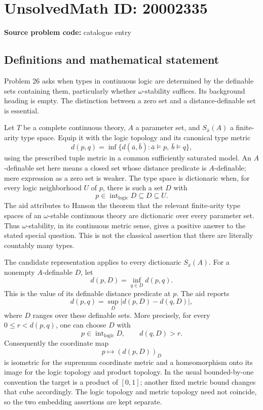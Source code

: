 \documentclass[11pt]{article}
\begin{document}
\section*{UnsolvedMath ID: 20002335}
\textbf{Source problem code:} catalogue entry
\subsection{Definitions and mathematical statement}
Problem 26 asks when types in continuous logic are determined by the definable sets containing them, particularly whether \(\omega\)-stability suffices. Its background heading is empty. The distinction between a zero set and a distance-definable set is essential.

Let \(T\) be a complete continuous theory, \(A\) a parameter set, and \(S_{\bar x}(A)\) a finite-arity type space. Equip it with the logic topology and its canonical type metric
\[
 d(p,q)=\inf\{d(\bar a,\bar b):\bar a\models p,\ \bar b\models q\},
\]
using the prescribed tuple metric in a common sufficiently saturated model. An \(A\)-definable set here means a closed set whose distance predicate is \(A\)-definable; mere expression as a zero set is weaker. The type space is dictionaric when, for every logic neighborhood \(U\) of \(p\), there is such a set \(D\) with
\[
 p\in\operatorname{int}_{\mathrm{logic}}D\subseteq D\subseteq U.
\]
The aid attributes to Hanson the theorem that the relevant finite-arity type spaces of an \(\omega\)-stable continuous theory are dictionaric over every parameter set. Thus \(\omega\)-stability, in its continuous metric sense, gives a positive answer to the stated special question. This is not the classical assertion that there are literally countably many types.

The candidate representation applies to every dictionaric \(S_{\bar x}(A)\). For a nonempty \(A\)-definable \(D\), let
\[
 d(p,D)=\inf_{q\in D}d(p,q).
\]
This is the value of its definable distance predicate at \(p\). The aid reports
\[
 d(p,q)=\sup_D|d(p,D)-d(q,D)|,
\]
where \(D\) ranges over these definable sets. More precisely, for every \(0\le r<d(p,q)\), one can choose \(D\) with
\[
 p\in\operatorname{int}_{\mathrm{logic}}D,
 \qquad d(q,D)>r.
\]
Consequently the coordinate map
\[
 p\longmapsto(d(p,D))_D
\]
is isometric for the supremum coordinate metric and a homeomorphism onto its image for the logic topology and product topology. In the usual bounded-by-one convention the target is a product of \([0,1]\); another fixed metric bound changes that cube accordingly. The logic topology and metric topology need not coincide, so the two embedding assertions are kept separate.
\end{document}

